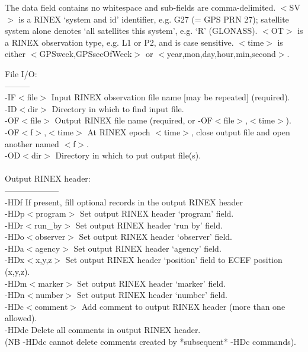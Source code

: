 \documentclass{article}
\begin{document}
 The data field contains no whitespace and sub-fields are comma-delimited.
 $<$SV$>$ is a RINEX `system and id' identifier, e.g. G27 (= GPS PRN 27);
   satellite system alone denotes `all satellites this system', e.g. `R' (GLONASS).
 $<$OT$>$ is a RINEX observation type, e.g. L1 or P2, and is case sensitive.
 $<$time$>$ is either $<$GPSweek,GPSsecOfWeek$>$ or $<$year,mon,day,hour,min,second$>$.
\\
\begin{\outputsize}
 File I/O:\\
 ---------\\
 -IF$<$file$>$       Input RINEX observation file name [may be repeated] (required). \\
 -ID$<$dir$>$        Directory in which to find input file. \\
 -OF$<$file$>$       Output RINEX file name (required, or -OF$<$file$>$,$<$time$>$). \\
 -OF$<$f$>$,$<$time$>$   At RINEX epoch $<$time$>$, close output file and open another named $<$f$>$. \\
 -OD$<$dir$>$        Directory in which to put output file(s). \\
\\
 Output RINEX header:\\
 --------------------\\
 -HDf            If present, fill optional records in the output RINEX header\\
 -HDp$<$program$>$   Set output RINEX header `program' field.\\
 -HDr$<$run\_by$>$    Set output RINEX header `run by' field.\\
 -HDo$<$observer$>$  Set output RINEX header `observer' field.\\
 -HDa$<$agency$>$    Set output RINEX header `agency' field.\\
 -HDx$<$x,y,z$>$     Set output RINEX header `position' field to ECEF position (x,y,z).\\
 -HDm$<$marker$>$    Set output RINEX header `marker' field.\\
 -HDn$<$number$>$    Set output RINEX header `number' field.\\
 -HDc$<$comment$>$   Add comment to output RINEX header (more than one allowed).\\
 -HDdc           Delete all comments in output RINEX header.\\
           (NB -HDdc cannot delete comments created by *subsequent* -HDc commands).\\

\end{\outputsize}
\end{document}
